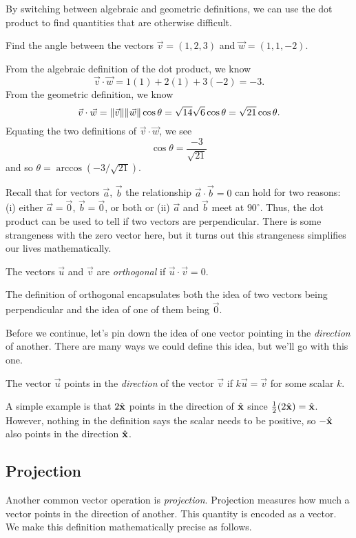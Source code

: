 By switching between algebraic and geometric definitions, we can use the dot
product to find quantities that are otherwise difficult.
\begin{example}
	Find the angle between the vectors $\vec v=(1,2,3)$ and $\vec w=(1,1,-2)$.

	From the algebraic definition of the dot product, we know
	\[
		\vec v\cdot \vec w = 1(1)+2(1)+3(-2) = -3.
	\]
	From the geometric definition, we know
	\[
		\vec v\cdot \vec w=\lVert\vec v\rVert\lVert\vec w\rVert\cos\theta
		=\sqrt{14}\sqrt{6}\cos\theta=\sqrt{21}\cos\theta.
	\]
	Equating the two definitions of $\vec v\cdot \vec w$, we see
	\[
		\cos\theta = \frac{-3}{\sqrt{21}}
	\]
	and so $\theta=\arccos(-3/\sqrt{21})$.
\end{example}

Recall that for vectors $\vec a$, $\vec b$ the relationship $\vec a\cdot \vec b=0$
can hold for two reasons: (i) either $\vec a=\vec 0$, $\vec b=\vec 0$, or both
or (ii) $\vec a$ and $\vec b$ meet at $90^{\circ}$.  Thus, the dot product
can be used to tell if two vectors are perpendicular.  There is some strangeness
with the zero vector here, but it turns out this strangeness simplifies our lives
mathematically.

\begin{definition}[Orthogonal]
	The vectors $\vec u$ and $\vec v$ are \emph{orthogonal}
	if $\vec u\cdot\vec v=0$.
\end{definition}

The definition of orthogonal encapsulates both the idea of two vectors being
perpendicular and the idea of one of them being $\vec 0$.

Before we continue, let's pin down the idea of one vector pointing
in the \emph{direction} of another.  There are many ways we could define
this idea, but we'll go with this one.

\begin{definition}
	The vector $\vec u$ points in the \emph{direction} of
	the vector $\vec v$ if $k\vec u=\vec v$ for some scalar $k$.
\end{definition}

A simple example is that $2{\hat {\mathbf x}}$ points in the direction of ${\hat {\mathbf x}}$ since 
$\frac{1}{2}(2{\hat {\mathbf x}})={\hat {\mathbf x}}$.  However, nothing in the definition says the
scalar needs to be positive, so $-{\hat {\mathbf x}}$ also points in the direction ${\hat {\mathbf x}}$.

\subsection{Projection}
Another common vector operation is \emph{projection}.
Projection measures how much a vector points in the direction
of another.  This quantity is encoded as a vector.  We make this
definition mathematically precise as follows.

